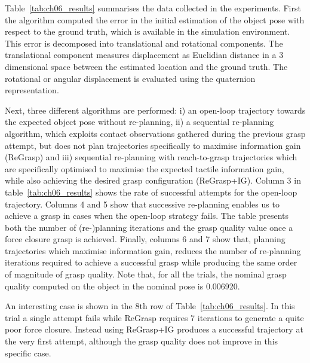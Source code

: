 Table~\ref{tab:ch06_results} summarises the data collected in the experiments. First the algorithm computed the error in the initial estimation of the object pose with respect to the ground truth, which is available in the simulation environment. This error is decomposed into translational and rotational components. The translational component measures  displacement as Euclidian distance in a 3 dimensional space between the estimated location and the ground truth. The rotational or angular displacement is evaluated using the quaternion representation.

Next, three different algorithms are performed: i) an open-loop trajectory towards the expected object pose without re-planning, ii) a sequential re-planning algorithm, which exploits contact observations gathered during the previous grasp attempt, but does not plan trajectories specifically to maximise information gain (ReGrasp) and iii) sequential re-planning with reach-to-grasp trajectories which are specifically optimised to maximise the expected tactile information gain, while also achieving the desired grasp configuration (ReGrasp+IG). Column 3 in table~\ref{tab:ch06_results} shows the rate of successful attempts for the open-loop trajectory. Columns 4 and 5 show that successive re-planning enables us to achieve a grasp in cases when the open-loop strategy fails. The table presents both the number of (re-)planning iterations and the grasp quality value once a force closure grasp is achieved. Finally, columns 6 and 7 show that, planning trajectories which maximise information gain, reduces the number of re-planning iterations required to achieve a successful grasp while producing the same order of magnitude of grasp quality. 
Note that, for all the trials, the nominal grasp quality computed on the object in the nominal pose is 0.006920. 

An interesting case is shown in the 8th row of Table~\ref{tab:ch06_results}. In this trial a single attempt fails while ReGrasp requires 7 iterations to generate a quite poor force closure. Instead using ReGrasp+IG produces a successful trajectory at the very first attempt, although the grasp quality does not improve in this specific case.

